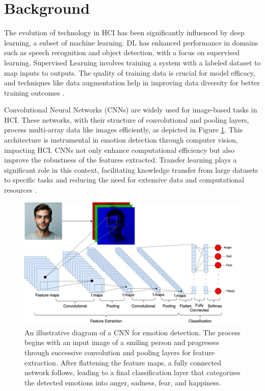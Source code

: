 \documentclass[runningheads]{llncs}
\begin{document}
\section{Background}
\label{sec:background}

The evolution of technology in HCI has been significantly influenced by deep learning, a subset of machine learning. DL has enhanced performance in domains such as speech recognition and object detection, with a focus on supervised learning. Supervised Learning involves training a system with a labeled dataset to map inputs to outputs. The quality of training data is crucial for model efficacy, and techniques like data augmentation help in improving data diversity for better training outcomes \cite{Alrowais2023, Martinez2017, Lecun2015, Mahony2020, Shorten2019, Khalifa2022}.

Convolutional Neural Networks (CNNs) are widely used for image-based tasks in HCI. These networks, with their structure of convolutional and pooling layers, process multi-array data like images efficiently, as depicted in Figure \ref{fig:cnnarchitecture}. This architecture is instrumental in emotion detection through computer vision, impacting HCI. CNNs not only enhance computational efficiency but also improve the robustness of the features extracted. Transfer learning plays a significant role in this context, facilitating knowledge transfer from large datasets to specific tasks and reducing the need for extensive data and computational resources \cite{Lecun2015, Khan2020}.

\begin{figure}[htb]
\centering
\includegraphics[width=0.97\linewidth]{CNNArchitecture.jpg}
\caption{An illustrative diagram of a CNN for emotion detection. The process begins with an input image of a smiling person and progresses through successive convolution and pooling layers for feature extraction. After flattening the feature maps, a fully connected network follows, leading to a final classification layer that categorizes the detected emotions into anger, sadness, fear, and happiness.}
\label{fig:cnnarchitecture}
\end{figure}
\end{document}
